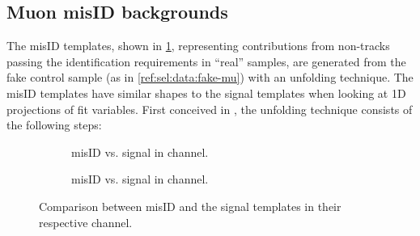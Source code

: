 \subsection{Muon misID backgrounds}
\label{ref:fit:tmpl:misid}

The \muon misID templates,
shown in \cref{fig:misid-vs-sig},
representing contributions from non-\muon tracks passing the \muon
identification requirements in ``real'' \muon samples,
are generated from the fake \muon control sample
(as in \cref{ref:sel:data:fake-mu}) with an unfolding technique.
The \muon misID templates have similar shapes to the signal templates when
looking at 1D projections of fit variables.
First conceived in \cite{LHCb-ANA-2016-059}, the unfolding technique
consists of the following steps:

\begin{figure}[htb]
    \centering
    \begin{subfigure}[t]{0.45\textwidth}
        \centering
        \caption{
            misID vs. signal in \Dz channel.
        }
    \end{subfigure}
    \begin{subfigure}[t]{0.45\textwidth}
        \centering
        \caption{
            misID vs. signal in \Dstar channel.
        }
    \end{subfigure}

    \caption{
        Comparison between misID and the signal templates in their
        respective channel.
    }
    \label{fig:misid-vs-sig}
\end{figure}


